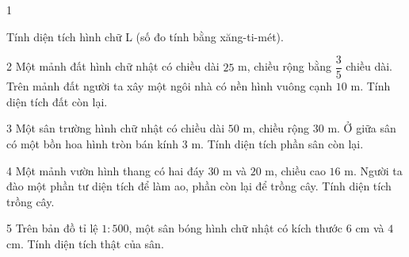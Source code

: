 \begin{probbox}{1}{\relax}
\begin{minipage}[t]{0.66\linewidth}
Tính diện tích hình chữ L (số đo tính bằng xăng-ti-mét).
\end{minipage}\hfill
\begin{minipage}[t]{0.3\linewidth}\vspace{0pt}\centering
{}
\end{minipage}
\end{probbox}
\gap
\begin{probbox}{2}{\relax}
Một mảnh đất hình chữ nhật có chiều dài $25$ m, chiều rộng bằng $\dfrac35$ chiều dài. Trên mảnh đất người ta xây một ngôi nhà có nền hình vuông cạnh $10$ m. Tính diện tích đất còn lại.
\end{probbox}
\gap
\begin{probbox}{3}{\relax}
Một sân trường hình chữ nhật có chiều dài $50$ m, chiều rộng $30$ m. Ở giữa sân có một bồn hoa hình tròn bán kính $3$ m. Tính diện tích phần sân còn lại.
\end{probbox}
\gap
\begin{probbox}{4}{\relax}
Một mảnh vườn hình thang có hai đáy $30$ m và $20$ m, chiều cao $16$ m. Người ta đào một phần tư diện tích để làm ao, phần còn lại để trồng cây. Tính diện tích trồng cây.
\end{probbox}
\gap
\begin{probbox}{5}{\relax}
Trên bản đồ tỉ lệ $1:500$, một sân bóng hình chữ nhật có kích thước $6$ cm và $4$ cm. Tính diện tích thật của sân.
\end{probbox}
